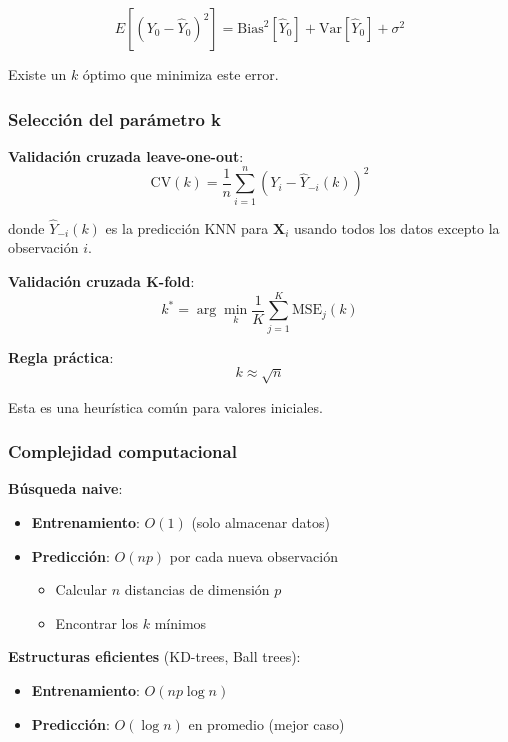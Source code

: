 \documentclass[
  doc,
  floatsintext,
  longtable,
  a4paper,
  nolmodern,
  notxfonts,
  notimes,
  12pt,
  colorlinks=true,linkcolor=blue,citecolor=blue,urlcolor=blue]{apa7}
\providecommand{\tightlist}{%
  \setlength{\itemsep}{0pt}\setlength{\parskip}{0pt}}
\begin{document}
\[
E[(Y_0 - \hat{Y}_0)^2] = \text{Bias}^2[\hat{Y}_0] + \text{Var}[\hat{Y}_0] + \sigma^2
\]

Existe un \(k\) óptimo que minimiza este error.

\subsubsection{Selección del parámetro
k}\label{selecciuxf3n-del-paruxe1metro-k}

\textbf{Validación cruzada leave-one-out}: \[
\text{CV}(k) = \frac{1}{n} \sum_{i=1}^{n} (Y_i - \hat{Y}_{-i}(k))^2
\]

donde \(\hat{Y}_{-i}(k)\) es la predicción KNN para \(\mathbf{X}_i\)
usando todos los datos excepto la observación \(i\).

\textbf{Validación cruzada K-fold}: \[
k^* = \arg\min_{k} \frac{1}{K} \sum_{j=1}^{K} \text{MSE}_j(k)
\]

\textbf{Regla práctica}: \[
k \approx \sqrt{n}
\]

Esta es una heurística común para valores iniciales.

\subsubsection{Complejidad
computacional}\label{complejidad-computacional}

\textbf{Búsqueda naive}:

\begin{itemize}
\tightlist
\item
  \textbf{Entrenamiento}: \(O(1)\) (solo almacenar datos)
\item
  \textbf{Predicción}: \(O(np)\) por cada nueva observación

  \begin{itemize}
  \tightlist
  \item
    Calcular \(n\) distancias de dimensión \(p\)
  \item
    Encontrar los \(k\) mínimos
  \end{itemize}
\end{itemize}

\textbf{Estructuras eficientes} (KD-trees, Ball trees):

\begin{itemize}
\tightlist
\item
  \textbf{Entrenamiento}: \(O(np \log n)\)
\item
  \textbf{Predicción}: \(O(\log n)\) en promedio (mejor caso)
\end{itemize}
\end{document}
